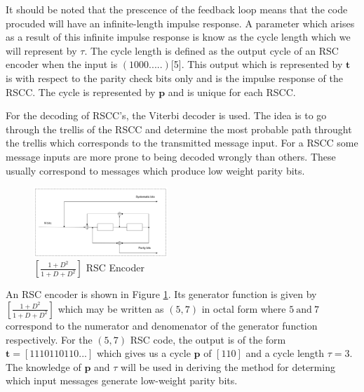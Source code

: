 \documentclass[conference]{IEEEtran}
\begin{document}
It should be noted that the prescence of the feedback loop means that the code procuded will have an infinite-length impulse response. A parameter which arises as a result of this infinite impulse response is know as the cycle length which we will represent by $\tau$. The cycle length is defined as the output cycle of an RSC encoder when the input is $(1 0 0 0 .....)$[5]. This output which is represented by $\textbf{t} $ is with respect to the parity check bits only and is the impulse response of the RSCC. The cycle is represented by $\textbf{p}$ and is unique for each RSCC. 


For the decoding of RSCC's, the Viterbi decoder is used. The idea is to go through the trellis of the RSCC and determine the most probable path throught the trellis which corresponds to the transmitted message input. For a RSCC some message inputs are more prone to being decoded wrongly than others. These usually correspond to messages which produce low weight parity bits. 

\begin{figure}[h]
\centering
		\includegraphics[width=0.45\textwidth]{RSCExample3.pdf}
		\caption{$[\frac{1+D^2}{1+D+D^2}]$  RSC Encoder}
		\label{fig1}
		\end{figure}
		
An RSC encoder is shown in Figure \ref{fig1}. Its generator function is given by $[\frac{1+D^2}{1+D+D^2}]$ which may be written as $(5,7)$ in octal form where $5 ~ \text{and} ~ 7$ correspond to the numerator and denomenator of the generator function respectively. 
 For the $(5,7)$ RSC code, the output is of the form $\textbf{t}=[1 1 1 0 1 1 0 1 1 0 ...]$ which gives us a cycle $\textbf{p}$ of $[1 1 0]$ and a cycle length $\tau =3$.
The knowledge of $\textbf{p}$ and $\tau$ will be used in deriving the method for determing which input messages generate low-weight parity bits. 
\end{document}

